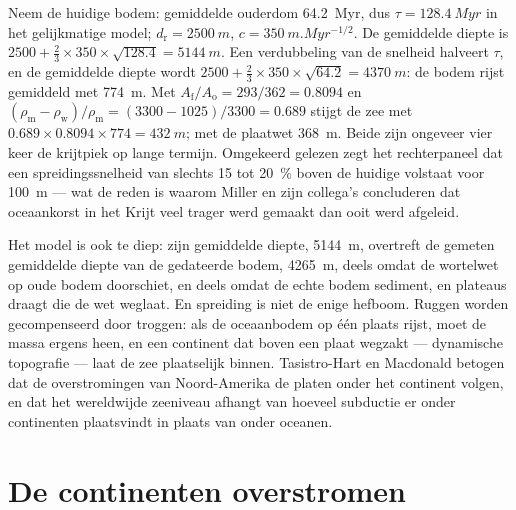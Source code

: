 \begin{example}\label{ex:b2:phanerozoic-earth:doubling}
Neem de huidige bodem: gemiddelde ouderdom \qty{64.2}{Myr}, dus $\tau = \qty{128.4}{Myr}$ in het gelijkmatige model;
$d_{\text{r}} = \qty{2500}{m}$, $c = \qty{350}{m.Myr^{-1/2}}$. De gemiddelde diepte is $2500 + \tfrac23
\times 350 \times \sqrt{128.4} = \qty{5144}{m}$. Een verdubbeling van de snelheid halveert $\tau$, en de gemiddelde
diepte wordt $2500 + \tfrac23 \times 350 \times \sqrt{64.2} = \qty{4370}{m}$: de bodem rijst gemiddeld met
\qty{774}{m}. Met $A_{\text{f}}/A_{\text{o}} = 293/362 = 0.8094$ en
$(\rho_{\text{m}} - \rho_{\text{w}})/\rho_{\text{m}} = (3300 - 1025)/3300 = 0.689$ stijgt de zee
met $0.689 \times 0.8094 \times 774 = \qty{432}{m}$; met de plaatwet \qty{368}{m}. Beide zijn
ongeveer vier keer de krijtpiek op lange termijn. Omgekeerd gelezen zegt het rechterpaneel dat een
spreidingssnelheid van slechts 15 tot \qty{20}{\percent} boven de huidige volstaat voor \qty{100}{m} --- wat
de reden is waarom Miller en zijn collega's concluderen dat oceaankorst in het
Krijt veel trager werd gemaakt dan ooit werd afgeleid.
\end{example}

Het model is ook te diep: zijn gemiddelde diepte, \qty{5144}{m}, overtreft de gemeten gemiddelde diepte van
de gedateerde bodem, \qty{4265}{m}, deels omdat de wortelwet op oude bodem doorschiet, en
deels omdat de echte bodem sediment,  en plateaus draagt die de wet weglaat. En spreiding is niet de
enige hefboom. Ruggen worden gecompenseerd door troggen: als de oceaanbodem op één plaats rijst, moet de massa
ergens heen, en een continent dat boven een plaat wegzakt --- dynamische topografie --- laat de zee
plaatselijk binnen. Tasistro-Hart en Macdonald betogen dat de overstromingen van Noord-Amerika de platen
onder het continent volgen, en dat het wereldwijde zeeniveau afhangt van hoeveel subductie er onder
continenten plaatsvindt in plaats van onder oceanen.

\section{De continenten overstromen}\label{sec:b2:phanerozoic-earth:flooding}

